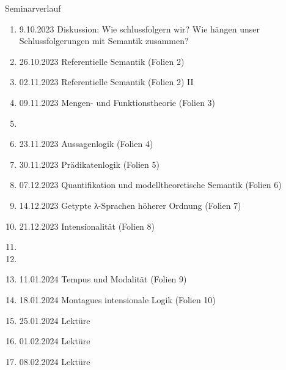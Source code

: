 \begin{frame}
  {Seminarverlauf}
  \onslide<+->
  \begin{enumerate}[<+->]\Lf\scriptsize
    \item \alert{9.10.2023} Diskussion: Wie schlussfolgern wir? Wie hängen unser Schlussfolgerungen mit Semantik zusammen?
    \item \alert{26.10.2023} Referentielle Semantik (Folien 2)
    \item \alert{02.11.2023} Referentielle Semantik (Folien 2) II
    \item \alert{09.11.2023} Mengen- und Funktionstheorie (Folien 3)
    \item[\rule{1.2em}{1.2em}] 
    \item \alert{23.11.2023} Aussagenlogik (Folien 4)
    \item \alert{30.11.2023} Prädikatenlogik (Folien 5)
    \item \alert{07.12.2023} Quantifikation und modelltheoretische Semantik (Folien 6)
    \item \alert{14.12.2023} Getypte λ-Sprachen höherer Ordnung (Folien 7)
    \item \alert{21.12.2023} Intensionalität (Folien 8)
    \item[\rule{1.2em}{1.2em}] 
    \item[\rule{1.2em}{1.2em}] 
    \item \alert{11.01.2024} Tempus und Modalität (Folien 9)
    \item \alert{18.01.2024} Montagues intensionale Logik (Folien 10)
    \item \alert{25.01.2024} Lektüre 
    \item \alert{01.02.2024} Lektüre
    \item \alert{08.02.2024} Lektüre
  \end{enumerate}
\end{frame}

